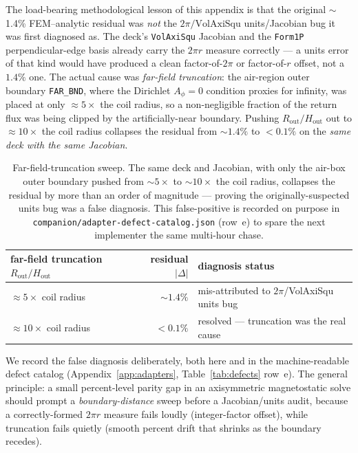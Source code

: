 The load-bearing methodological lesson of this appendix is that the original
$\sim$1.4\% FEM--analytic residual was \emph{not} the $2\pi/\text{VolAxiSqu}$
units/Jacobian bug it was first diagnosed as. The deck's \texttt{VolAxiSqu}
Jacobian and the \texttt{Form1P} perpendicular-edge basis already carry the
$2\pi r$ measure correctly --- a units error of that kind would have produced a
clean factor-of-$2\pi$ or factor-of-$r$ offset, not a $1.4\%$ one. The actual
cause was \emph{far-field truncation}: the air-region outer boundary
\texttt{FAR\_BND}, where the Dirichlet $A_\phi=0$ condition proxies for
infinity, was placed at only $\approx5\times$ the coil radius, so a
non-negligible fraction of the return flux was being clipped by the
artificially-near boundary. Pushing $R_{\text{out}}/H_{\text{out}}$ out to
$\approx10\times$ the coil radius collapses the residual from $\sim1.4\%$ to
$<0.1\%$ on the \emph{same deck with the same Jacobian}.

\begin{table}[h]
\centering
\small
\begin{tabular}{lrl}
\toprule
far-field truncation $R_{\text{out}}/H_{\text{out}}$ & residual $|\Delta|$ & diagnosis status \\
\midrule
$\approx5\times$ coil radius  & $\sim1.4\%$  & mis-attributed to $2\pi$/VolAxiSqu units bug \\
$\approx10\times$ coil radius & $<0.1\%$     & resolved --- truncation was the real cause \\
\bottomrule
\end{tabular}
\caption{Far-field-truncation sweep. The same deck and Jacobian, with only the
air-box outer boundary pushed from $\sim5\times$ to $\sim10\times$ the coil
radius, collapses the residual by more than an order of magnitude --- proving
the originally-suspected units bug was a false diagnosis. This false-positive
is recorded on purpose in \texttt{companion/adapter-defect-catalog.json}
(row~e) to spare the next implementer the same multi-hour chase.}
\label{tab:app:farfield}
\end{table}

We record the false diagnosis deliberately, both here and in the
machine-readable defect catalog (Appendix~\ref{app:adapters},
Table~\ref{tab:defects} row~e). The general principle: a small percent-level
parity gap in an axisymmetric magnetostatic solve should prompt a
\emph{boundary-distance} sweep before a Jacobian/units audit, because a
correctly-formed $2\pi r$ measure fails loudly (integer-factor offset), while
truncation fails quietly (smooth percent drift that shrinks as the boundary
recedes).


